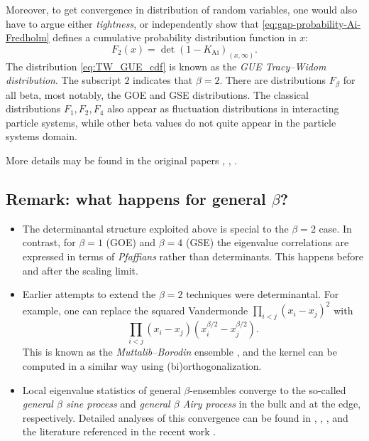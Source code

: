 \documentclass[letterpaper,11pt,oneside,reqno]{article}
\numberwithin{equation}{section}
\theoremstyle{definition}
\begin{document}
Moreover, to get convergence in distribution of random variables,
one would also have to argue either \emph{tightness},
or independently show that
\eqref{eq:gap-probability-Ai-Fredholm} defines a
cumulative probability
distribution function in $x$:
\begin{equation}
	\label{eq:TW_GUE_cdf}
	F_2(x)=\det\left( 1-K_{\mathrm{Ai}} \right)_{(x,\infty)}.
\end{equation}
The distribution \eqref{eq:TW_GUE_cdf} is known as the \emph{GUE Tracy--Widom distribution}.
The subscript $2$ indicates that $\beta=2$. There are distributions
$F_\beta$ for all beta, most notably, the GOE and GSE distributions.
The classical distributions $F_1,F_2,F_4$ also appear as fluctuation distributions
in interacting particle systems, while other beta values do
not quite appear in the particle systems
domain.

More details
may be found in the original papers
\cite{tracy1993level},
\cite{Forrester1993},
\cite{tracy_widom1994level_airy}.



\subsection{Remark: what happens for general $\beta$?}

\begin{itemize}
    \item The determinantal structure exploited above is special to the $\beta=2$ case. In contrast, for $\beta=1$ (GOE) and $\beta=4$ (GSE) the eigenvalue correlations are expressed in terms of \emph{Pfaffians} rather than determinants.
			This happens before and after the scaling limit.
		\item
			Earlier attempts to extend the $\beta=2$ techniques
			were determinantal. For example, one can replace the
			squared Vandermonde $\prod_{i<j} (x_i-x_j)^2$ with
			\begin{equation*}
			 \prod_{i<j} (x_i-x_j)(x_i^{\beta/2}-x_j^{\beta/2}).
			\end{equation*}
			This is known as the \emph{Muttalib--Borodin} ensemble
			\cite{forrester2017},
			and the kernel can be computed in a similar way using (bi)orthogonalization.
		\item Local eigenvalue statistics of general $\beta$-ensembles converge to the so-called
			\emph{general $\beta$ sine process}
			and
			\emph{general $\beta$ Airy process}
			in the bulk and at the edge, respectively.
			Detailed analyses of this convergence can be found in
			\cite{RamirezRiderVirag2006RandomAiry},
			\cite{valko2009continuum},
			\cite{gorin2018stochastic},
			and the literature referenced in the recent work 
			\cite{gorin2024airy}.
\end{itemize}
\end{document}
